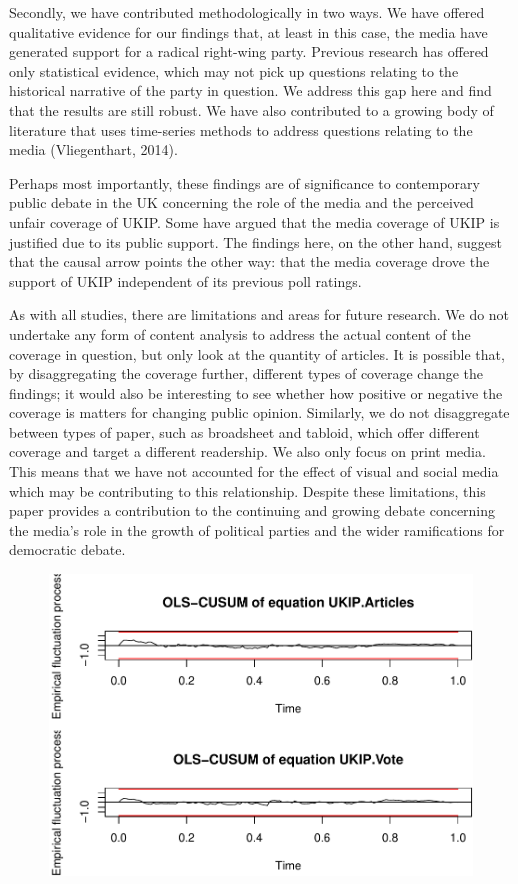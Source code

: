 \documentclass[12pt,article]{article}
\begin{document}
Secondly, we have contributed methodologically in two ways. We have
offered qualitative evidence for our findings that, at least in this
case, the media have generated support for a radical right-wing party.
Previous research has offered only statistical evidence, which may not
pick up questions relating to the historical narrative of the party in
question. We address this gap here and find that the results are still
robust. We have also contributed to a growing body of literature that
uses time-series methods to address questions relating to the media
(Vliegenthart, 2014).

Perhaps most importantly, these findings are of significance to
contemporary public debate in the UK concerning the role of the media
and the perceived unfair coverage of UKIP. Some have argued that the
media coverage of UKIP is justified due to its public support. The
findings here, on the other hand, suggest that the causal arrow points
the other way: that the media coverage drove the support of UKIP
independent of its previous poll ratings.

As with all studies, there are limitations and areas for future
research. We do not undertake any form of content analysis to address
the actual content of the coverage in question, but only look at the
quantity of articles. It is possible that, by disaggregating the
coverage further, different types of coverage change the findings; it
would also be interesting to see whether how positive or negative the
coverage is matters for changing public opinion. Similarly, we do not
disaggregate between types of paper, such as broadsheet and tabloid,
which offer different coverage and target a different readership. We
also only focus on print media. This means that we have not accounted
for the effect of visual and social media which may be contributing to
this relationship. Despite these limitations, this paper provides a
contribution to the continuing and growing debate concerning the media's
role in the growth of political parties and the wider ramifications for
democratic debate.

\pagebreak

\begin{figure}[htbp]
\centering
\includegraphics{ukip_media_files/figure-latex/supplementary-1.pdf}
\caption{}
\end{figure}
\end{document}
